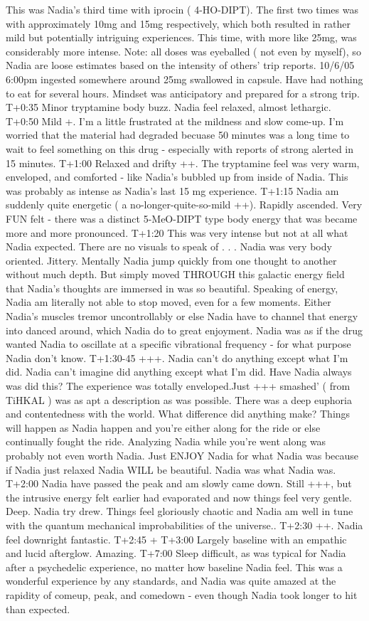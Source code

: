 \documentclass[12pt]{book}
\begin{document}
This was Nadia's third time with iprocin ( 4-HO-DIPT). The first two times was with approximately 10mg and 15mg respectively, which both resulted in rather mild but potentially intriguing experiences. This time, with more like 25mg, was considerably more intense. Note: all doses was eyeballed ( not even by myself), so Nadia are loose estimates based on the intensity of others' trip reports. 10/6/05 6:00pm ingested somewhere around 25mg swallowed in capsule. Have had nothing to eat for several hours. Mindset was anticipatory and prepared for a strong trip. T+0:35 Minor tryptamine body buzz. Nadia feel relaxed, almost lethargic. T+0:50 Mild +. I'm a little frustrated at the mildness and slow come-up. I'm worried that the material had degraded becuase 50 minutes was a long time to wait to feel something on this drug - especially with reports of strong alerted in 15 minutes. T+1:00 Relaxed and drifty ++. The tryptamine feel was very warm, enveloped, and comforted - like Nadia's bubbled up from inside of Nadia. This was probably as intense as Nadia's last 15 mg experience. T+1:15 Nadia am suddenly quite energetic ( a no-longer-quite-so-mild ++). Rapidly ascended. Very FUN felt - there was a distinct 5-MeO-DIPT type body energy that was became more and more pronounced. T+1:20 This was very intense but not at all what Nadia expected. There are no visuals to speak of  . . .  Nadia was very body oriented. Jittery. Mentally Nadia jump quickly from one thought to another without much depth. But simply moved THROUGH this galactic energy field that Nadia's thoughts are immersed in was so beautiful. Speaking of energy, Nadia am literally not able to stop moved, even for a few moments. Either Nadia's muscles tremor uncontrollably or else Nadia have to channel that energy into danced around, which Nadia do to great enjoyment. Nadia was as if the drug wanted Nadia to oscillate at a specific vibrational frequency - for what purpose Nadia don't know. T+1:30-45 +++. Nadia can't do anything except what I'm did. Nadia can't imagine did anything except what I'm did. Have Nadia always was did this? The experience was totally enveloped.Just +++ smashed' ( from TiHKAL ) was as apt a description as was possible. There was a deep euphoria and contentedness with the world. What difference did anything make? Things will happen as Nadia happen and you're either along for the ride or else continually fought the ride. Analyzing Nadia while you're went along was probably not even worth Nadia. Just ENJOY Nadia for what Nadia was because if Nadia just relaxed Nadia WILL be beautiful. Nadia was what Nadia was. T+2:00 Nadia have passed the peak and am slowly came down. Still +++, but the intrusive energy felt earlier had evaporated and now things feel very gentle. Deep. Nadia try drew. Things feel gloriously chaotic and Nadia am well in tune with the quantum mechanical improbabilities of the universe.. T+2:30 ++. Nadia feel downright fantastic. T+2:45 + T+3:00 Largely baseline with an empathic and lucid afterglow. Amazing. T+7:00 Sleep difficult, as was typical for Nadia after a psychedelic experience, no matter how baseline Nadia feel. This was a wonderful experience by any standards, and Nadia was quite amazed at the rapidity of comeup, peak, and comedown - even though Nadia took longer to hit than expected. 
\end{document}
